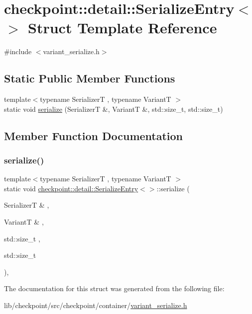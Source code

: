 \hypertarget{structcheckpoint_1_1detail_1_1_serialize_entry_3_4}{}\section{checkpoint\+:\+:detail\+:\+:Serialize\+Entry$<$$>$ Struct Template Reference}
\label{structcheckpoint_1_1detail_1_1_serialize_entry_3_4}


{\ttfamily \#include $<$variant\+\_\+serialize.\+h$>$}

\subsection*{Static Public Member Functions}
\begin{DoxyCompactItemize}
\item 
{\footnotesize template$<$typename SerializerT , typename VariantT $>$ }\\static void \hyperlink{structcheckpoint_1_1detail_1_1_serialize_entry_3_4_acfef9b3527b1d894f764b8f62bb4ca39}{serialize} (SerializerT \&, VariantT \&, std\+::size\+\_\+t, std\+::size\+\_\+t)
\end{DoxyCompactItemize}


\subsection{Member Function Documentation}
\mbox{\label{structcheckpoint_1_1detail_1_1_serialize_entry_3_4_acfef9b3527b1d894f764b8f62bb4ca39}} 
\subsubsection{\texorpdfstring{serialize()}{serialize()}}
{\footnotesize\ttfamily template$<$typename SerializerT , typename VariantT $>$ \\
static void \hyperlink{structcheckpoint_1_1detail_1_1_serialize_entry}{checkpoint\+::detail\+::\+Serialize\+Entry}$<$$>$\+::serialize (\begin{DoxyParamCaption}\item[{SerializerT \&}]{,  }\item[{VariantT \&}]{,  }\item[{std\+::size\+\_\+t}]{,  }\item[{std\+::size\+\_\+t}]{ }\end{DoxyParamCaption})\hspace{0.3cm}{\ttfamily [inline]}, {\ttfamily [static]}}



The documentation for this struct was generated from the following file\+:\begin{DoxyCompactItemize}
\item 
lib/checkpoint/src/checkpoint/container/\hyperlink{variant__serialize_8h}{variant\+\_\+serialize.\+h}\end{DoxyCompactItemize}
